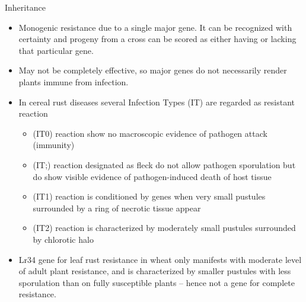 \documentclass[11pt,dvipsnames,ignorenonframetext,aspectratio=169]{beamer}
\providecommand{\tightlist}{%
  \setlength{\itemsep}{0pt}\setlength{\parskip}{0pt}}
\begin{document}
\begin{frame}{Inheritance}
\protect\hypertarget{inheritance}{}
\small

\begin{itemize}
\tightlist
\item
  \alert{Monogenic} resistance due to a single major gene. It can be
  recognized with certainty and progeny from a cross can be scored as
  either having or lacking that particular gene.
\item
  May not be completely effective, so major genes do not necessarily
  render plants immune from infection.
\item
  In cereal rust diseases several Infection Types (IT) are regarded as
  resistant reaction

  \begin{itemize}
  \tightlist
  \item
    (IT0) reaction show no macroscopic evidence of pathogen attack
    (immunity)
  \item
    (IT;) reaction designated as fleck do not allow pathogen sporulation
    but do show visible evidence of pathogen-induced death of host
    tissue
  \item
    (IT1) reaction is conditioned by genes when very small pustules
    surrounded by a ring of necrotic tissue appear
  \item
    (IT2) reaction is characterized by moderately small pustules
    surrounded by chlorotic halo
  \end{itemize}
\item
  Lr34 gene for leaf rust resistance in wheat only manifests with
  moderate level of adult plant resistance, and is characterized by
  smaller pustules with less sporulation than on fully susceptible
  plants -- hence not a gene for complete resistance.
\end{itemize}
\end{frame}
\end{document}
